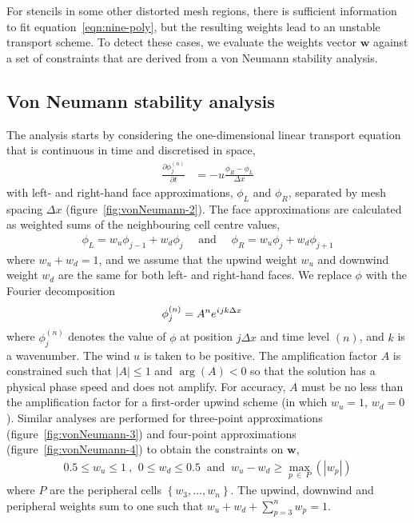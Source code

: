 \documentclass[a4paper,11pt]{article}
\newcommand{\iu}{{i\mkern1mu}}
\begin{document}
For stencils in some other distorted mesh regions, there is sufficient information to fit equation~\eqref{eqn:nine-poly}, but the resulting weights lead to an unstable transport scheme.  To detect these cases, we evaluate the weights vector $\mathbf{w}$ against a set of constraints that are derived from a von Neumann stability analysis.

\subsection*{Von Neumann stability analysis}
The analysis starts by considering the one-dimensional linear transport equation that is continuous in time and discretised in space,
\begin{align}
	\frac{\partial \phi^{(n)}_j}{\partial t} &= -u \frac{\phi_R - \phi_L}{\Delta x}
\end{align}
with left- and right-hand face approximations, $\phi_L$ and $\phi_R$, separated by mesh spacing $\Delta x$ (figure~\ref{fig:vonNeumann-2}).  The face approximations are calculated as weighted sums of the neighbouring cell centre values,
\begin{align}
	\phi_L = w_u \phi_{j-1} + w_d \phi_j \quad \text{ and } \quad \phi_R = w_u \phi_j + w_d \phi_{j+1}
\end{align}
where $w_u + w_d = 1$, and we assume that the upwind weight $w_u$ and downwind weight $w_d$ are the same for both left- and right-hand faces.  We replace $\phi$ with the Fourier decomposition 
\begin{align}
	\phi_j^{(n)} &= A^n e^{\iu j k \Delta x}
\end{align}
where $\phi_j^{(n)}$ denotes the value of $\phi$ at position $j \Delta x$ and time level $(n)$, and $k$ is a wavenumber.  The wind $u$ is taken to be positive.  The amplification factor $A$ is constrained such that $|A| \leq 1$ and $\arg(A) < 0$ so that the solution has a physical phase speed and does not amplify.  For accuracy, $A$ must be no less than the amplification factor for a first-order upwind scheme (in which $w_u = 1$, $w_d = 0$).  Similar analyses are performed for three-point approximations (figure~\ref{fig:vonNeumann-3}) and four-point approximations (figure~\ref{fig:vonNeumann-4}) to obtain the constraints on $\mathbf{w}$,
\begin{align}
	0.5 \leq w_u \leq 1 \ \text{, } \ 
	0 \leq w_d \leq 0.5 \ \text{ and }\ 
	w_u - w_d \geq \max_{p\:\in\:P}(|w_p|)
\end{align}
where $P$ are the peripheral cells $\left\{ w_3, \ldots, w_n \right\}$.  The upwind, downwind and peripheral weights sum to one such that $w_u + w_d + \sum_{p=3}^n w_p = 1$.
\end{document}
